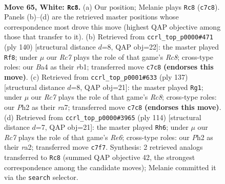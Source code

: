 \documentclass[11pt]{article}
\begin{document}
\clearpage

\begin{figure}[p]\centering
\begin{subfigure}{0.46\textwidth}\centering
\resizebox{\linewidth}{!}{%
\newchessgame
\chessboard[
  setfen={8/2R5/1k6/5p2/B4P2/4K3/7P/8 w - - 1 65},
  showmover=false,
  pgfstyle=straightmove, color=movearrow, markmove={c7-c8}
]}
\caption{}
\end{subfigure}\hfill
\begin{subfigure}{0.46\textwidth}\centering
\resizebox{\linewidth}{!}{%
\newchessgame
\chessboard[
  setfen={2R5/3k4/8/7p/5p1P/5P2/6K1/1r6 w - - 18 71},
  showmover=false,
  pgfstyle=straightmove, color=movearrow, markmove={c8-f8}
]}
\caption{}
\end{subfigure}
\\[4pt]
\begin{subfigure}{0.46\textwidth}\centering
\resizebox{\linewidth}{!}{%
\newchessgame
\chessboard[
  setfen={8/R7/8/5k2/4pP2/8/3K4/2r5 b - - 19 69},
  showmover=false,
  pgfstyle=straightmove, color=movearrow, markmove={c1-g1}
]}
\caption{}
\end{subfigure}\hfill
\begin{subfigure}{0.46\textwidth}\centering
\resizebox{\linewidth}{!}{%
\newchessgame
\chessboard[
  setfen={8/8/4R3/5k1p/8/6PK/r7/8 w - - 4 58},
  showmover=false,
  pgfstyle=straightmove, color=movearrow, markmove={e6-h6}
]}
\caption{}
\end{subfigure}
\caption{\textbf{Move 65, White: \texttt{Rc8}.} (a) Our position; Melanie plays \texttt{Rc8} (\texttt{c7c8}). Panels (b)--(d) are the retrieved master positions whose correspondence most drove this move (highest QAP objective among those that transfer to it). (b) Retrieved from \texttt{ccrl\_top\_p0000\#471} (ply 140) [structural distance $d$=8, QAP obj=22]: the master played \texttt{Rf8}; under $\mu$ our \emph{Rc7} plays the role of that game's \emph{Rc8}; cross-type roles: our \emph{B}a4 as their \emph{r}b1; transferred move \texttt{c7c8} \textbf{(endorses this move)}. (c) Retrieved from \texttt{ccrl\_top\_p0001\#633} (ply 137) [structural distance $d$=8, QAP obj=21]: the master played \texttt{Rg1}; under $\mu$ our \emph{Rc7} plays the role of that game's \emph{Rc8}; cross-type roles: our \emph{P}h2 as their \emph{r}a7; transferred move \texttt{c7c8} \textbf{(endorses this move)}. (d) Retrieved from \texttt{ccrl\_top\_p0000\#3965} (ply 114) [structural distance $d$=7, QAP obj=21]: the master played \texttt{Rh6}; under $\mu$ our \emph{Rc7} plays the role of that game's \emph{Re6}; cross-type roles: our \emph{P}h2 as their \emph{r}a2; transferred move \texttt{c7f7}. Synthesis: 2 retrieved analogs transferred to \texttt{Rc8} (summed QAP objective 42, the strongest correspondence among the candidate moves); Melanie committed it via the \texttt{search} selector.}
\label{fig:thought-m128}
\end{figure}
\end{document}

